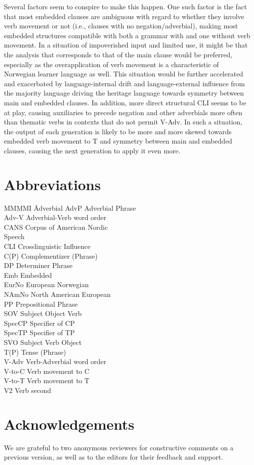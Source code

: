 \documentclass[output=paper]{langscibook}
\begin{document}
Several factors seem to conspire to make this happen. One such factor is the fact that most embedded clauses are ambiguous with regard to whether they involve verb movement or not (i.e., clauses with no negation\slash adverbial), making most embedded structures compatible with both a grammar with and one without verb movement. In a situation of impoverished input and limited use, it might be that the analysis that corresponds to that of the main clause would be preferred, especially as the overapplication of verb movement is a characteristic of Norwegian learner language as well. This situation would be further accelerated and exacerbated by language-internal drift and language-external influence from the majority language driving the heritage language towards symmetry between main and embedded clauses. In addition, more direct structural CLI seems to be at play, causing auxiliaries to precede negation and other adverbials more often than thematic verbs in contexts that do not permit V-Adv. In such a situation, the output of each generation is likely to be more and more skewed towards embedded verb movement to T and symmetry between main and embedded clauses, causing the next generation to apply it even more.

\section*{Abbreviations}
\begin{multicols}{2}
\begin{tabbing}
MMMMI \= Adverbial\kill
AdvP   \>  Adverbial Phrase\\
Adv-V  \>  Adverbial-Verb word order\\
CANS   \>  Corpus of American Nordic \\ \> Speech\\
CLI    \>  Crosslinguistic Influence\\
C(P)   \>  Complementizer (Phrase)\\
DP     \>  Determiner Phrase\\
Emb    \>  Embedded\\
EurNo  \>  European Norwegian\\
NAmNo  \>  North American European\\
PP     \>  Prepositional Phrase\\
SOV    \>  Subject Object Verb\\
SpecCP \>  Specifier of CP\\
SpecTP \>  Specifier of TP\\
SVO    \>  Subject Verb Object\\
T(P)   \>  Tense (Phrase)\\
V-Adv  \>  Verb-Adverbial word order\\
V-to-C \>  Verb movement to C\\
V-to-T \>  Verb movement to T\\
V2     \>  Verb second
\end{tabbing}
\end{multicols}

\section*{Acknowledgements}

We are grateful to two anonymous reviewers for constructive comments on a previous version, as well as to the editors for their feedback and support.

\printbibliography[heading=subbibliography,notkeyword=this]
\end{document}
